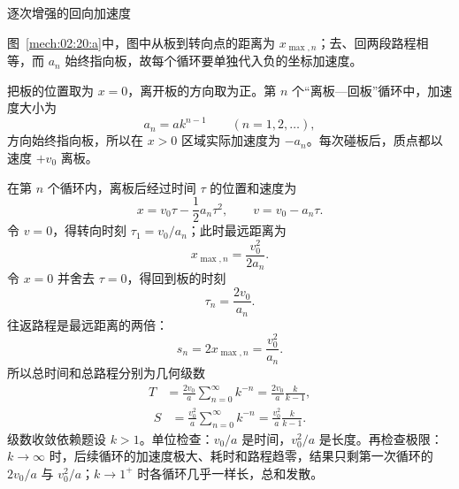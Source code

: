 {\begin{origexamplebox}{逐次增强的回向加速度}
\begin{qualityfigure}
\label{mech:02:20:q}
\end{qualityfigure}
\end{origexamplebox}
\begin{xesolution}
\begin{qualityfigure}
\label{mech:02:20:a}
\end{qualityfigure}
图~\ref{mech:02:20:a}中，图中从板到转向点的距离为 $x_{\max,n}$；去、回两段路程相等，而 $a_n$ 始终指向板，故每个循环要单独代入负的坐标加速度。

把板的位置取为 $x=0$，离开板的方向取为正。第 $n$ 个“离板—回板”循环中，加速度大小为
\[
a_n=ak^{n-1}\qquad(n=1,2,\ldots),
\]
方向始终指向板，所以在 $x>0$ 区域实际加速度为 $-a_n$。每次碰板后，质点都以速度 $+v_0$ 离板。

在第 $n$ 个循环内，离板后经过时间 $\tau$ 的位置和速度为
\[
x=v_0\tau-\frac12a_n\tau^2,
\qquad
v=v_0-a_n\tau.
\]
令 $v=0$，得转向时刻 $\tau_1=v_0/a_n$；此时最远距离为
\[
x_{\max,n}=\frac{v_0^2}{2a_n}.
\]
令 $x=0$ 并舍去 $\tau=0$，得回到板的时刻
\[
\tau_n=\frac{2v_0}{a_n}.
\]
往返路程是最远距离的两倍：
\[
s_n=2x_{\max,n}=\frac{v_0^2}{a_n}.
\]
所以总时间和总路程分别为几何级数
\[
\begin{aligned}
T&=\frac{2v_0}{a}\sum_{n=0}^{\infty}k^{-n}
=\boxed{\frac{2v_0}{a}\frac{k}{k-1}},
\end{aligned}
\]
\[
\begin{aligned}
S&=\frac{v_0^2}{a}\sum_{n=0}^{\infty}k^{-n}
=\boxed{\frac{v_0^2}{a}\frac{k}{k-1}}.
\end{aligned}
\]
级数收敛依赖题设 $k>1$。单位检查：$v_0/a$ 是时间，$v_0^2/a$ 是长度。再检查极限：$k\to\infty$ 时，后续循环的加速度极大、耗时和路程趋零，结果只剩第一次循环的 $2v_0/a$ 与 $v_0^2/a$；$k\to1^+$ 时各循环几乎一样长，总和发散。
\end{xesolution}

}
